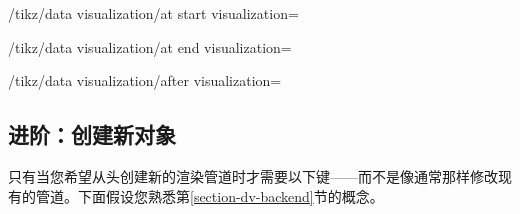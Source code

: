 %
\begin{key}{/tikz/data visualization/at start visualization=} %
\end{key}
%
\begin{key}{/tikz/data visualization/at end visualization=} %
\end{key}
%
\begin{key}{/tikz/data visualization/after visualization=} %
\end{key}


\subsection{进阶：创建新对象}


只有当您希望从头创建新的渲染管道时才需要以下键——而不是像通常那样修改现有的管道。下面假设您熟悉第\ref{section-dv-backend}节的概念。

